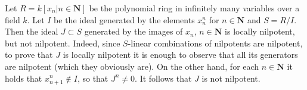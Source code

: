 \begin{example}
\label{example-locally-nilpotent-not-nilpotent}
Let $R = k[x_n | n \in \mathbf{N}]$ be the polynomial ring in infinitely
many variables over a field $k$. Let $I$ be the ideal generated by
the elements $x_n^n$ for $n \in \mathbf{N}$ and $S = R/I$. Then the ideal
$J \subset S$ generated by the images of $x_n$, $n \in \mathbf{N}$
is locally nilpotent, but not nilpotent. Indeed, since $S$-linear
combinations of nilpotents are nilpotent, to prove that $J$ is locally
nilpotent it is enough to observe that all its generators are nilpotent
(which they obviously are). On the other hand, for each $n \in \mathbf{N}$
it holds that $x_{n + 1}^n \not \in I$, so that $J^n \not = 0$.
It follows that $J$ is not nilpotent.
\end{example}